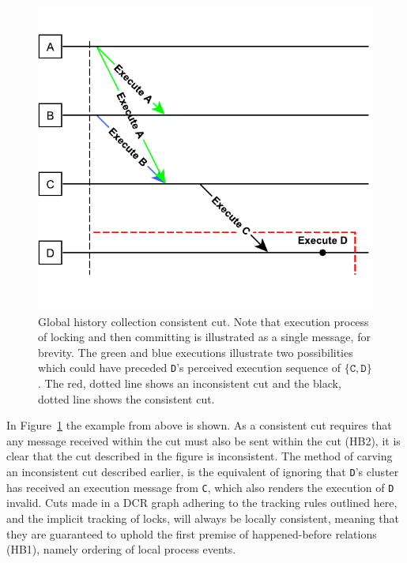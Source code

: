 \documentclass{article}
\begin{document}
	\begin{figure}[ht!]
		\center
		\includegraphics[scale=0.6]{figures/dcr-graphs/global-history-collection-consistent-cut.pdf}
		\caption{Global history collection consistent cut. Note that execution process of locking and then committing is illustrated as a single message, for brevity. The green and blue executions illustrate two possibilities which could have preceded \texttt{D}'s perceived execution sequence of $\{\texttt{C}, \texttt{D}\}$. The red, dotted line shows an inconsistent cut and the black, dotted line shows the consistent cut.}
		\label{fig:global-history-collection-consistent-cut}
	\end{figure}
    \FloatBarrier

	In Figure~\ref{fig:global-history-collection-consistent-cut} the example from above is shown.
	As a consistent cut requires that any message received within the cut must also be sent within the cut (HB2), it is clear that the cut described in the figure is inconsistent.
	The method of carving an inconsistent cut described earlier, is the equivalent of ignoring that \texttt{D}'s cluster has received an execution message from \texttt{C}, which also renders the execution of \texttt{D} invalid.
	Cuts made in a DCR graph adhering to the tracking rules outlined here, and the implicit tracking of locks, will always be locally consistent, meaning that they are guaranteed to uphold the first premise of happened-before relations (HB1), namely ordering of local process events.
\end{document}
